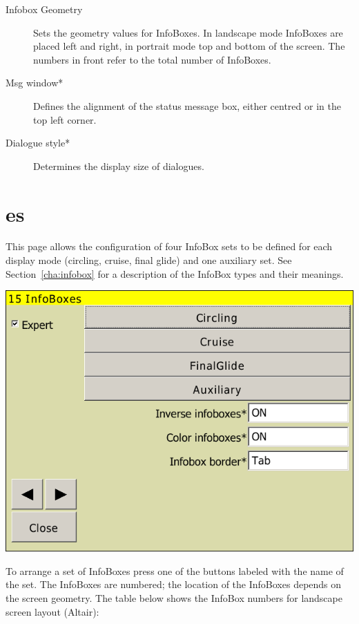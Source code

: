 \begin{description}
\item[Infobox Geometry]  Sets the geometry values for InfoBoxes. In landscape
mode InfoBoxes are placed left and right, in portrait mode top and bottom of the screen. The numbers in front refer 
to the total number of InfoBoxes.
\item[Msg window*]  Defines the alignment of the status message box, either
centred or in the top left corner.
\item[Dialogue style*]  Determines the display size of dialogues.
\end{description}





\clearpage
\section{{\InfoBox}es}

This page allows the configuration of four InfoBox sets to be defined for each
display mode (circling, cruise, final glide) and one auxiliary set.  See
Section~\ref{cha:infobox} for a description of the InfoBox types and their meanings.

\begin{center}
\includegraphics[angle=0,width=0.8\linewidth,keepaspectratio='true']{figures/config-infoboxes.png}
\end{center}

To arrange a set of InfoBoxes press one of the buttons labeled with the name
of the set.  The InfoBoxes are numbered; the location of the InfoBoxes depends
on the screen geometry.  The table below shows the InfoBox numbers for landscape screen layout (Altair):

